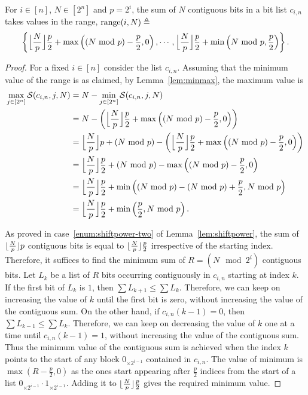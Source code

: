 \begin{theorem}
\label{thm:shiftrange}
 For $i \in [n]$, $N\in[2^{n}]$ and $p=2^i$, the sum of $N$ contiguous bits in a bit list $c_{i,n}$ takes values in the range, ${\rm range}(i,N) \triangleq$
 $$ 
 \left\{
	\floor[\Big]{\frac{N}{p}} \frac{p}{2} + \max \left( (N\mod p) - \frac{p}{2}, 0 \right),
  	\cdots,
   	\floor[\Big]{\frac{N}{p}} \frac{p}{2} + \min \left( N\mod p, \frac{p}{2} \right)
 \right\}.
 $$
\end{theorem}
\begin{proof}
 For a fixed $i\in[n]$ consider the list $c_{i,n}$. Assuming that the minimum value of the range is as claimed, by Lemma~\ref{lem:minmax}, the maximum value is
\begin{align*}
   \max_{j \in [2^n]} \mathcal{S}(c_{i,n}, j, N)
   &= N-\min_{j \in [2^n]} \mathcal{S}(c_{i,n}, j, N)\\
   &=N- \left( \floor[\Big]{\frac{N}{p}} \frac{p}{2} + \max \left( (N\mod p) - \frac{p}{2}, 0 \right)\right)\\
 &= \floor[\Big]{\frac{N}{p}}p + (N\mod p) - 
 \left( 
 \floor [\Big] {\frac{N}{p}} \frac{p}{2} + \max \left( (N\mod p) - \frac{p}{2}, 0 \right)
 \right)	\\
 &= \floor[\Big]{\frac{N}{p}} \frac{p}{2} +(N\mod p) - 
 \max	\left(		(N \mod p) - \frac{p}{2}, 	0 	\right)	\\
 &= \floor[\Big]{\frac{N}{p}} \frac{p}{2} + \min \left( (N\mod p)-(N \mod p) + \frac{p}{2}, N\mod p\right)\\
 &=  \floor[\Big]{\frac{N}{p}} \frac{p}{2} + \min \left(\frac{p}{2}, N\mod p\right).
\end{align*}
 
 As proved in case~\ref{enum:shiftpower-two} of Lemma~\ref{lem:shiftpower}, the sum of $\floor{\frac{N}{p}}p$ contiguous bits is equal to $\floor{\frac{N}{p}}\frac{p}{2}$  irrespective of the starting index.
 Therefore, it suffices to find the minimum sum of $R=(N\mod 2^i)$ contiguous bits. Let $L_k$ be a list of $R$ bits occurring contiguously in $c_{i,n}$ starting at index $k$. If the first bit of $L_k$ is $1$, then $\sum L_{k+1}\leq \sum L_k$. Therefore, we can keep on increasing the value of $k$ until the first bit is zero,  without increasing the value of the contiguous sum. On the other hand, if $c_{i,n}(k-1)=0$, then $\sum L_{k-1}\leq \sum L_k$. Therefore, we can keep on decreasing the value of $k$ one at a time until $c_{i,n}(k-1)=1$, without increasing the value of the contiguous sum. Thus the minimum value of the contiguous sum is achieved when the index $k$ points to the start of any block $0_{\times 2^{i-1}}$ contained in $c_{i,n}$. The value of minimum is  $\max(R-\frac{p}{2},0)$ as the ones start appearing after $\frac{p}{2}$ indices from the start of a list $0_{\times 2^{i-1}}\cdot 1_{\times 2^{i-1}}$.  Adding it to $\floor{\frac{N}{p}}\frac{p}{2}$ gives the required minimum value.
\end{proof}

